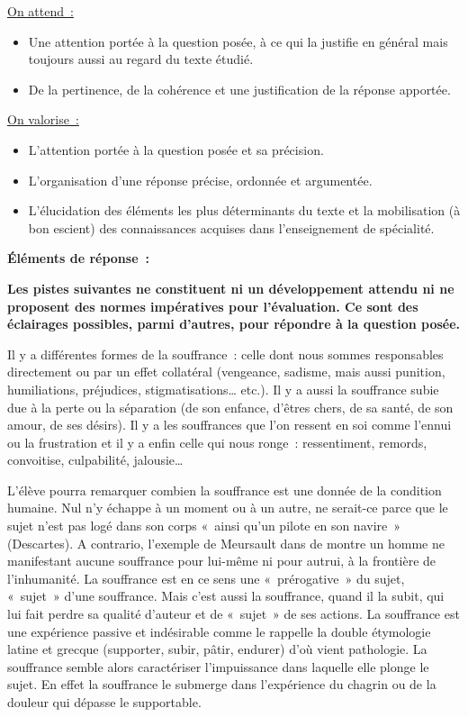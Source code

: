 {\underline{On attend~:}
\begin{itemize}
\item Une attention portée à la question posée, à ce qui la justifie en général mais toujours aussi
au regard du texte étudié.
\item De la pertinence, de la cohérence et une justification de la réponse apportée.
\end{itemize}

\underline{On valorise~:}
\begin{itemize}
\item L'attention portée à la question posée et sa précision.
\item L'organisation d'une réponse précise, ordonnée et argumentée.
\item L'élucidation des éléments les plus déterminants du texte et la mobilisation (à bon escient)
des connaissances acquises dans l'enseignement de spécialité.
\end{itemize}

\bigskip

\textbf{Éléments de réponse~:}

\textbf{Les pistes suivantes ne constituent ni un développement attendu ni ne proposent des
normes impératives pour l'évaluation. Ce sont des éclairages possibles, parmi d'autres,
pour répondre à la question posée.}

Il y a différentes formes de la souffrance~: celle dont nous sommes responsables
directement ou par un effet collatéral (vengeance, sadisme, mais aussi punition, humiliations,
préjudices, stigmatisations… etc.). Il y a aussi la souffrance subie due à la perte ou la séparation
(de son enfance, d'êtres chers, de sa santé, de son amour, de ses désirs). Il y a les souffrances
que l'on ressent en soi comme l'ennui ou la frustration et il y a enfin celle qui nous ronge~:
ressentiment, remords, convoitise, culpabilité, jalousie…

L'élève pourra remarquer combien la souffrance est une donnée de la condition humaine.
Nul n'y échappe à un moment ou à un autre, ne serait-ce parce que le sujet n'est pas logé dans
son corps «~ainsi qu'un pilote en son navire~» (Descartes). A contrario, l'exemple de Meursault
dans  de  montre un homme ne manifestant aucune souffrance pour lui-même
ni pour autrui, à la frontière de l'inhumanité. La souffrance est en ce sens une «~prérogative~» du
sujet, «~sujet~» d'une souffrance. Mais c'est aussi la souffrance, quand il la subit, qui lui fait perdre
sa qualité d'auteur et de «~sujet~» de ses actions. La souffrance est une expérience passive et
indésirable comme le rappelle la double étymologie latine et grecque (supporter, subir, pâtir,
endurer) d'où vient pathologie. La souffrance semble alors caractériser l'impuissance dans
laquelle elle plonge le sujet. En effet la souffrance le submerge dans l'expérience du chagrin ou
de la douleur qui dépasse le supportable.

}
